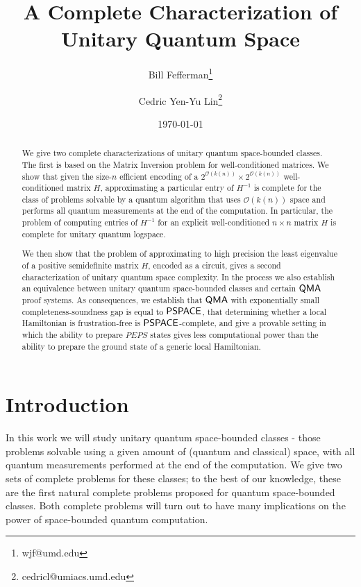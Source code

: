 \documentclass[11pt]{article}
\theoremstyle{definition}
\theoremstyle{remark}
\newcommand\QMA{{\sf{QMA}}}
\newcommand\PSPACE{{\sf{PSPACE}}}
\begin{document}
\begin{titlepage}
\title{A Complete Characterization of Unitary Quantum Space}
\author[1]{Bill Fefferman\thanks{wjf@umd.edu}}
\author[1]{Cedric Yen-Yu Lin\thanks{cedricl@umiacs.umd.edu}}
\date{\today}
\maketitle
\begin{abstract}
We give two complete characterizations of unitary quantum space-bounded classes.  The first is based on the Matrix Inversion problem for well-conditioned matrices.  We show that given the size-$n$ efficient encoding of a $2^{\mathcal{O}(k(n))} \times 2^{\mathcal{O}(k(n))}$ well-conditioned matrix $H$, approximating a particular entry of $H^{-1}$ is complete for the class of problems solvable by a quantum algorithm that uses $\mathcal{O}(k(n))$ space and performs all quantum measurements at the end of the computation. In particular, the problem of computing entries of $H^{-1}$ for an explicit well-conditioned $n \times n$ matrix $H$ is complete for unitary quantum logspace.

We then show that the problem of approximating to high precision the least eigenvalue of a positive semidefinite matrix $H$, encoded as a circuit, gives a second characterization of unitary quantum space complexity. In the process we also establish an equivalence between unitary quantum space-bounded classes and certain $\QMA$ proof systems. As  consequences, we establish that $\QMA$ with exponentially small completeness-soundness gap is equal to $\PSPACE$, that determining whether a local Hamiltonian is frustration-free is $\PSPACE$-complete, and give a provable setting in which the ability to prepare $PEPS$ states gives less computational power than the ability to prepare the ground state of a generic local Hamiltonian.
\end{abstract}
\thispagestyle{empty}
\end{titlepage}
\clearpage
\setcounter{page}{1}
\section{Introduction}
In this work we will study unitary quantum space-bounded classes - those problems solvable using a given amount of (quantum and classical) space, with all quantum measurements performed at the end of the computation. We give two sets of complete problems for these classes; to the best of our knowledge, these are the first natural complete problems proposed for quantum space-bounded classes. Both complete problems will turn out to have many implications on the power of space-bounded quantum computation.
\end{document}
